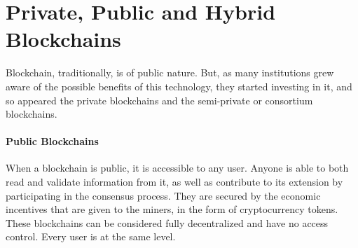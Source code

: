 
\section{Private, Public and Hybrid Blockchains}

    Blockchain, traditionally, is of public nature. But, as many institutions grew aware of the possible benefits of this technology, they started investing in it, and so appeared the private blockchains and the semi-private or consortium blockchains.
    
    \paragraph{Public Blockchains} When a blockchain is public, it is accessible to any user. Anyone is able to both read and validate information from it, as well as contribute to its extension by participating in the consensus process. They are secured by the economic incentives that are given to the miners, in the form of cryptocurrency tokens. These blockchains can be  considered fully decentralized and have no access control. Every user is at the same level.
    
